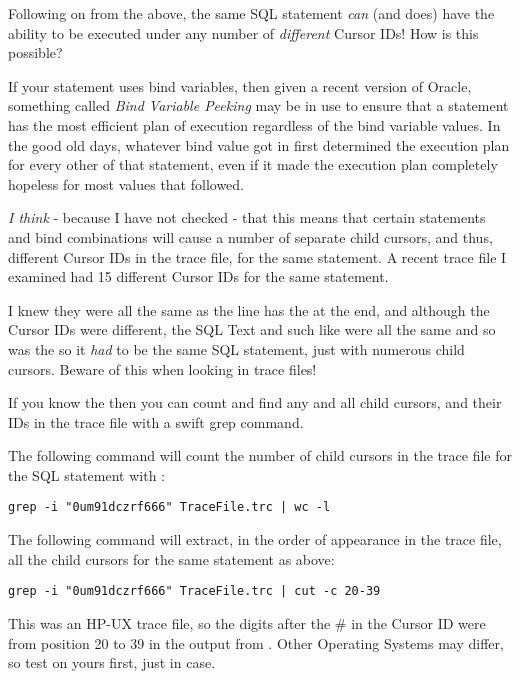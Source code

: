 Following on from the above, the same SQL statement \emph{can} (and does) have the ability to be executed under any number of \emph{different} Cursor IDs! How is this possible?

If your statement uses bind variables, then given a recent version of Oracle, something called \emph{Bind Variable Peeking} may be in use to ensure that a statement has the most efficient plan of execution regardless of the bind variable values. In the good old days, whatever bind value got in first determined the execution plan for every other  of that statement, even if it made the execution plan completely hopeless for most values that followed.

\emph{I think} - because I have not checked - that this means that certain statements and bind combinations will cause a number of separate child cursors, and thus, different Cursor IDs in the trace file, for the same statement. A recent trace file I examined had 15 different Cursor IDs for the same statement. 

I knew they were all the same as the  line has the  at the end, and although the Cursor IDs were different, the SQL Text and such like were all the same and so was the  so it \emph{had} to be the same SQL statement, just with numerous child cursors. Beware of this when looking in trace files!

If you know the  then you can count and find any and all child cursors, and their IDs in the trace file with a swift grep command.

The following command will count the number of child cursors in the trace file for the SQL statement with :

\begin{lstlisting}[numbers=none,caption={Counting Child Cursors in a Trace File}]
grep -i "0um91dczrf666" TraceFile.trc | wc -l
\end{lstlisting}

The following command will extract, in the order of appearance in the trace file, all the child cursors for the same statement as above:

\begin{lstlisting}[numbers=none,caption={Extracting Child Cursors from a Trace File}]
grep -i "0um91dczrf666" TraceFile.trc | cut -c 20-39
\end{lstlisting}

This was an HP-UX trace file, so the digits after the \# in the Cursor ID were from position 20 to 39 in the output from . Other Operating Systems may differ, so test on yours first, just in case.

